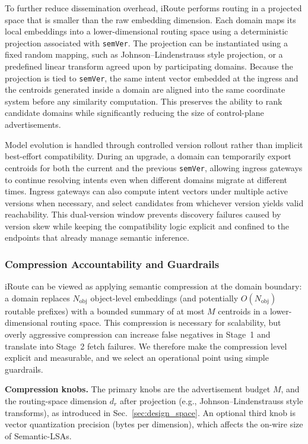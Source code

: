 \documentclass[journal]{IEEEtran}
\newcommand{\sysname}{iRoute}
\newcommand{\boldparagraph}[1]{\vspace{0.1cm}\noindent\textbf{#1.}}
\begin{document}
To further reduce dissemination overhead, \sysname{} performs routing in a projected space that is smaller than the raw embedding dimension. Each domain maps its local embeddings into a lower-dimensional routing space using a deterministic projection associated with \texttt{semVer}. The projection can be instantiated using a fixed random mapping, such as Johnson--Lindenstrauss style projection, or a predefined linear transform agreed upon by participating domains. Because the projection is tied to \texttt{semVer}, the same intent vector embedded at the ingress and the centroids generated inside a domain are aligned into the same coordinate system before any similarity computation. This preserves the ability to rank candidate domains while significantly reducing the size of control-plane advertisements.

Model evolution is handled through controlled version rollout rather than implicit best-effort compatibility. During an upgrade, a domain can temporarily export centroids for both the current and the previous \texttt{semVer}, allowing ingress gateways to continue resolving intents even when different domains migrate at different times. Ingress gateways can also compute intent vectors under multiple active versions when necessary, and select candidates from whichever version yields valid reachability. This dual-version window prevents discovery failures caused by version skew while keeping the compatibility logic explicit and confined to the endpoints that already manage semantic inference.

\subsubsection{Compression Accountability and Guardrails}
\label{sec:design_compression}

\sysname{} can be viewed as applying semantic compression at the domain boundary: a domain replaces $N_{\text{obj}}$
object-level embeddings (and potentially $O(N_{\text{obj}})$ routable prefixes) with a bounded summary of at most $M$
centroids in a lower-dimensional routing space.
This compression is necessary for scalability, but overly aggressive compression can increase false negatives in Stage~1
and translate into Stage~2 fetch failures.
We therefore make the compression level explicit and measurable, and we select an operational point using simple guardrails.

\boldparagraph{Compression knobs}
The primary knobs are the advertisement budget $M$, and the routing-space dimension $d_r$ after projection
(e.g., Johnson--Lindenstrauss style transforms), as introduced in Sec.~\ref{sec:design_space}.
An optional third knob is vector quantization precision (bytes per dimension), which affects the on-wire size of Semantic-LSAs.
\end{document}
